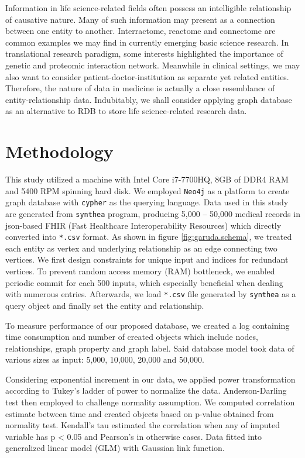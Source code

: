 \documentclass[]{article}
\begin{document}
Information in life science-related fields often possess an intelligible
relationship of causative nature. Many of such information may present
as a connection between one entity to another. Interractome, reactome
and connectome are common examples we may find in currently emerging
basic science research. In translational research paradigm, some
interests highlighted the importance of genetic and proteomic
interaction network. Meanwhile in clinical settings, we may also want to
consider patient-doctor-institution as separate yet related entities.
Therefore, the nature of data in medicine is actually a close
resemblance of entity-relationship data. Indubitably, we shall consider
applying graph database as an alternative to RDB to store life
science-related research data.

\hypertarget{methodology}{%
\section{Methodology}\label{methodology}}

This study utilized a machine with Intel Core i7-7700HQ, 8GB of DDR4 RAM
and 5400 RPM spinning hard disk. We employed \texttt{Neo4j} as a
platform to create graph database with \texttt{cypher} as the querying
language. Data used in this study are generated from \texttt{synthea}
program, producing 5,000 -- 50,000 medical records in json-based FHIR
(Fast Healthcare Interoperability Resources) which directly converted
into \texttt{*.csv} format. As shown in figure \ref{fig:garuda.schema},
we treated each entity as vertex and underlying relationship as an edge
connecting two vertices. We first design constraints for unique input
and indices for redundant vertices. To prevent random access memory
(RAM) bottleneck, we enabled periodic commit for each 500 inputs, which
especially beneficial when dealing with numerous entries. Afterwards, we
load \texttt{*.csv} file generated by \texttt{synthea} as a query object
and finally set the entity and relationship.

To measure performance of our proposed database, we created a log
containing time consumption and number of created objects which include
nodes, relationships, graph property and graph label. Said database
model took data of various sizes as input: 5,000, 10,000, 20,000 and
50,000.

Considering exponential increment in our data, we applied power
transformation according to Tukey's ladder of power to normalize the
data. Anderson-Darling test then employed to challenge normality
assumption. We computed correlation estimate between time and created
objects based on p-value obtained from normality test. Kendall's tau
estimated the correlation when any of imputed variable has p \textless{}
0.05 and Pearson's in otherwise cases. Data fitted into generalized
linear model (GLM) with Gaussian link function.
\end{document}
